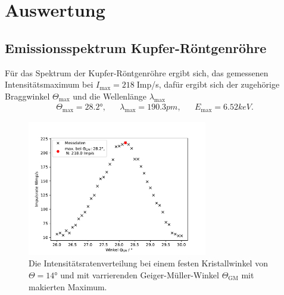 \newpage
\section{Auswertung}
\subsection{Emissionsspektrum Kupfer-Röntgenröhre}
Für das Spektrum der Kupfer-Röntgenröhre ergibt sich, das gemessenen
Intensitätsmaximum bei $I_{\text{max}}=218\;$Imp/s, dafür ergibt sich
der zugehörige Braggwinkel $\Theta_{\text{max}}$ und die Wellenlänge $\lambda_{\text{max}}$
\begin{align*}
    \Theta_{\text{max}}=28.2°, && \lambda_{\text{max}}=190.3\si{pm},&&E_{\text{max}}=6.52\si{keV}.
\end{align*}
\begin{figure}[H]
    \centering
    \includegraphics[width=0.7\textwidth]{plots/messdaten1.pdf}
    \caption{Die Intensitätsratenverteilung bei einem festen Kristallwinkel
    von $\Theta=14$° und mit varrierenden Geiger-Müller-Winkel $\Theta_{\text{GM}}$ mit makierten Maximum.}
    \label{fig:spektrums}
\end{figure}
\newpage
